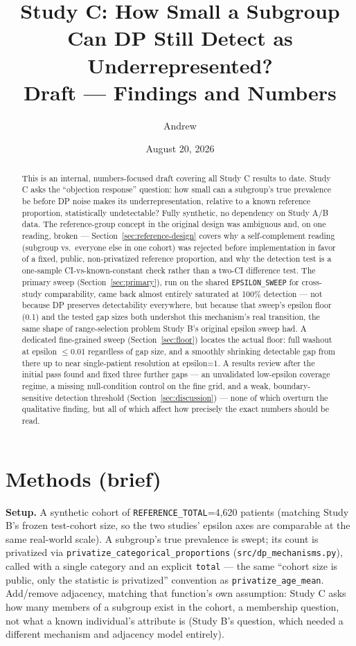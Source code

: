 \documentclass[11pt]{article}
\title{Study C: How Small a Subgroup Can DP Still Detect as Underrepresented? \\ \large Draft --- Findings and Numbers}
\author{Andrew}
\date{August 20, 2026}
\begin{document}
\maketitle

\begin{abstract}
\noindent This is an internal, numbers-focused draft covering all Study C results to date. Study C asks the ``objection response'' question: how small can a subgroup's true prevalence be before DP noise makes its underrepresentation, relative to a known reference proportion, statistically undetectable? Fully synthetic, no dependency on Study A/B data. The reference-group concept in the original design was ambiguous and, on one reading, broken --- Section~\ref{sec:reference-design} covers why a self-complement reading (subgroup vs.\ everyone else in one cohort) was rejected before implementation in favor of a fixed, public, non-privatized reference proportion, and why the detection test is a one-sample CI-vs-known-constant check rather than a two-CI difference test. The primary sweep (Section~\ref{sec:primary}), run on the shared \texttt{EPSILON\_SWEEP} for cross-study comparability, came back almost entirely saturated at 100\% detection --- not because DP preserves detectability everywhere, but because that sweep's epsilon floor (0.1) and the tested gap sizes both undershot this mechanism's real transition, the same shape of range-selection problem Study B's original epsilon sweep had. A dedicated fine-grained sweep (Section~\ref{sec:floor}) locates the actual floor: full washout at epsilon $\leq$0.01 regardless of gap size, and a smoothly shrinking detectable gap from there up to near single-patient resolution at epsilon=1. A results review after the initial pass found and fixed three further gaps --- an unvalidated low-epsilon coverage regime, a missing null-condition control on the fine grid, and a weak, boundary-sensitive detection threshold (Section~\ref{sec:discussion}) --- none of which overturn the qualitative finding, but all of which affect how precisely the exact numbers should be read.
\end{abstract}

\section{Methods (brief)}

\textbf{Setup.} A synthetic cohort of \texttt{REFERENCE\_TOTAL}=4{,}620 patients (matching Study B's frozen test-cohort size, so the two studies' epsilon axes are comparable at the same real-world scale). A subgroup's true prevalence is swept; its count is privatized via \texttt{privatize\_categorical\_proportions} (\texttt{src/dp\_mechanisms.py}), called with a single category and an explicit \texttt{total} --- the same ``cohort size is public, only the statistic is privatized'' convention as \texttt{privatize\_age\_mean}. Add/remove adjacency, matching that function's own assumption: Study C asks how many members of a subgroup exist in the cohort, a membership question, not what a known individual's attribute is (Study B's question, which needed a different mechanism and adjacency model entirely).
\end{document}
